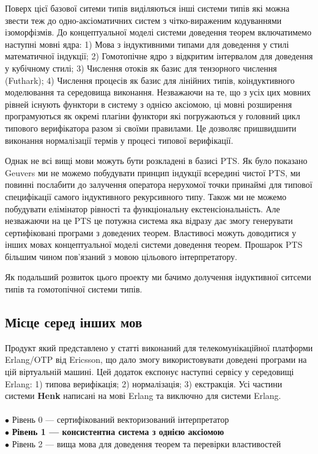 \documentclass{article}
\begin{document}
Поверх цієї базової ситеми типів виділяються інші системи типів які можна звести теж до одно-аксіоматичних систем
з чітко-вираженим кодуваннями ізоморфізмів. До концептуальної моделі системи доведення теорем включатимемо
наступні мовні ядра:
1) Мова з індуктивними типами для доведення у стилі математичної індукції;
2) Гомотопічне ядро з відкритим інтервалом для доведення у кубічному стилі;
3) Числення отоків як базис для тензорного числення (Futhark);
4) Числення процесів як базис для лінійних типів, коіндуктивного моделювання та середовища виконання.
Незважаючи на те, що з усіх цих мовних рівней існують функтори в систему з однією аксіомою, ці мовні розширення
програмуються як окремі плагіни функтори які погружаються у головний цикл типового верифікатора разом зі своїми правилами.
Це дозволяє пришвидшити виконання нормалізації термів у процесі типової верифікації.

Однак не всі вищі мови можуть бути розкладені в базисі PTS.
Як було показано Geuvers\cite{Geuvers01} ми не можемо побудувати принцип індукції всередині чистої PTS, ми повинні послабити
до залучення оператора нерухомої точки принаймі для типової специфікації самого індуктивного рекурсивного типу.
Також ми не можемо побудувати елімінатор рівності та функціональну екстенсіональність. Але незважаючи на це PTS
це потужна система яка відразу дає змогу генерувати сертифіковані програми з доведених теорем. Властивосі можуть доводитися
у інших мовах концептуальної моделі системи доведення теорем. Прошарок PTS більшим чином пов'язаний з мовою цільового інтерпретатору.

Як подальший розвиток цього проекту ми бачимо долучення індуктивної ситсеми типів та гомотопічної системи типів.

\subsection{Місце серед інших мов}
Продукт який представлено у статті виконаний для телекомунікаційної платформи Erlang/OTP від Ericsson,
що дало змогу використовувати доведені програми на цій віртуальній машині. Цей додаток експонує наступні
сервісу у середовищі Erlang: 1) типова верифікація; 2) нормалізація; 3) екстракція.
Усі частини системи \textbf{Henk} написані на мові Erlang та виключно для системи Erlang.
\\
\\ \noindent
$\bullet$ Рівень 0 --- сертифікований векторизований інтерпретатор\\
$\bullet$ {\bf Рівень 1 --- консистентна система з однією аксіомою} \\
$\bullet$ Рівень 2 --- вища мова для доведення теорем та перевірки властивостей \\
\end{document}
